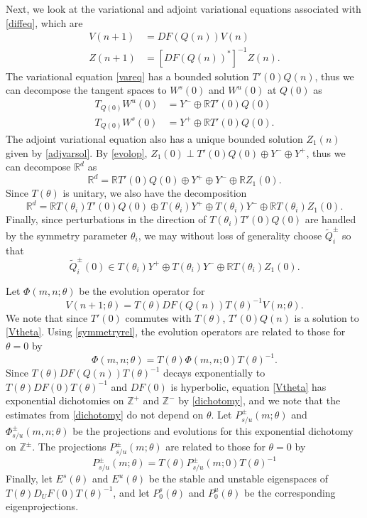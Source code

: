 \documentclass[12pt]{elsarticle}
\def\R{{\mathbb R}}
\def\Z{{\mathbb Z}}
\begin{document}
Next, we look at the variational and adjoint variational equations associated with \cref{diffeq}, which are
\begin{align}
V(n+1) &= D F(Q(n)) V(n) \label{vareq} \\
Z(n+1) &= [D F(Q(n))^*]^{-1} Z(n) . \label{adjvareq} 
\end{align}
The variational equation \cref{vareq} has a bounded solution $T'(0) Q(n)$, thus we can decompose the tangent spaces to $W^s(0)$ and $W^u(0)$ at $Q(0)$ as
\begin{align*}
T_{Q(0)} W^u(0) &= Y^- \oplus \R T'(0) Q(0) \\
T_{Q(0)} W^s(0) &= Y^+ \oplus \R T'(0) Q(0) .
\end{align*}
The adjoint variational equation also has a unique bounded solution $Z_1(n)$ given by \cref{adjvarsol}. By \cref{evolop}, $Z_1(0) \perp T'(0) Q(0) \oplus Y^- \oplus Y^+$, thus we can decompose $\R^d$ as
\begin{equation}\label{nontdecomp}
\R^d = \R T'(0) Q(0) \oplus Y^+ \oplus Y^- \oplus \R Z_1(0) .
\end{equation}
Since $T(\theta)$ is unitary, we also have the decomposition
\begin{equation}\label{nontdecompT}
\R^d = \R T(\theta_i) T'(0) Q(0) \oplus T(\theta_i) Y^+ \oplus T(\theta_i) Y^- \oplus \R T(\theta_i) Z_1(0).
\end{equation}
Finally, since perturbations in the direction of $T(\theta_i) T'(0) Q(0)$ are handled by the symmetry parameter $\theta_i$, we may without loss of generality choose $\tilde{Q}_i^\pm$ so that 
\begin{equation}\label{W0loc}
\tilde{Q}_i^\pm(0) \in T(\theta_i) Y^+ \oplus T(\theta_i) Y^- \oplus \R T(\theta_i) Z_1(0).
\end{equation}

Let $\Phi(m, n; \theta)$ be the evolution operator for
\begin{equation}\label{Vtheta}
V(n+1; \theta) = T(\theta) D F(Q(n)) T(\theta)^{-1} V(n; \theta) .
\end{equation}
We note that since $T'(0)$ commutes with $T(\theta)$, $T'(0)Q(n)$ is a solution to \cref{Vtheta}. Using \cref{symmetryrel}, the evolution operators are related to those for $\theta = 0$ by
\begin{equation}\label{evoloptheta}
\Phi(m, n; \theta) = T(\theta)\Phi(m, n; 0)T(\theta)^{-1}.
\end{equation}
Since $T(\theta) D F(Q(n)) T(\theta)^{-1}$ decays exponentially to $T(\theta) D F(0) T(\theta)^{-1}$ and $D F(0)$ is hyperbolic, equation \cref{Vtheta} has exponential dichotomies on $\Z^+$ and $\Z^-$ by \cref{dichotomy}, and we note that the estimates from \cref{dichotomy} do not depend on $\theta$. Let $P_{s/u}^\pm(m; \theta)$ and $\Phi_{s/u}^\pm(m, n; \theta)$ be the projections and evolutions for this exponential dichotomy on $\Z^\pm$. The projections $P_{s/u}^\pm(m; \theta)$ are related to those for $\theta = 0$ by
\[
P_{s/u}^\pm(m; \theta) = T(\theta)P_{s/u}^\pm(m; 0)T(\theta)^{-1}
\]
Finally, let $E^s(\theta)$ and $E^u(\theta)$ be the stable and unstable eigenspaces of $T(\theta) D_U F(0) T(\theta)^{-1}$, and let $P_0^s(\theta)$ and $P_0^u(\theta)$ be the corresponding eigenprojections.
\end{document}

